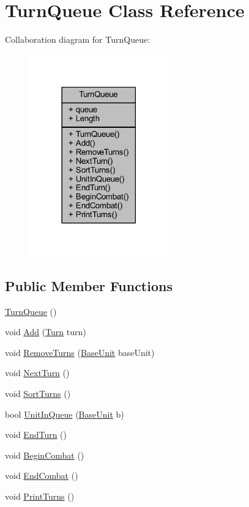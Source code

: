\hypertarget{class_turn_queue}{}\section{Turn\+Queue Class Reference}
\label{class_turn_queue}


Collaboration diagram for Turn\+Queue\+:
\nopagebreak
\begin{figure}[H]
\begin{center}
\leavevmode
\includegraphics[width=170pt]{class_turn_queue__coll__graph}
\end{center}
\end{figure}
\subsection*{Public Member Functions}
\begin{DoxyCompactItemize}
\item 
\mbox{\hyperlink{class_turn_queue_a15bbf8315c0dc5ad3d211872f3de296b}{Turn\+Queue}} ()
\item 
void \mbox{\hyperlink{class_turn_queue_aa677cc3ae9812e45a5b7e8932c199e27}{Add}} (\mbox{\hyperlink{class_turn}{Turn}} turn)
\item 
void \mbox{\hyperlink{class_turn_queue_af6ee9af337f42a417812f4bc96f8d600}{Remove\+Turns}} (\mbox{\hyperlink{class_base_unit}{Base\+Unit}} base\+Unit)
\item 
void \mbox{\hyperlink{class_turn_queue_acae6f91ff8006307a04d4ee9362c1b7e}{Next\+Turn}} ()
\item 
void \mbox{\hyperlink{class_turn_queue_afadc89a92617f7b2ee4e93025d2f2217}{Sort\+Turns}} ()
\item 
bool \mbox{\hyperlink{class_turn_queue_a7f1a7e7055e613cbd17f1d76d9bfd261}{Unit\+In\+Queue}} (\mbox{\hyperlink{class_base_unit}{Base\+Unit}} b)
\item 
void \mbox{\hyperlink{class_turn_queue_aadfdf0f72201cdc985ad2dbb9520eaee}{End\+Turn}} ()
\item 
void \mbox{\hyperlink{class_turn_queue_a7de50ac6b689f76c71d808962b6d1b86}{Begin\+Combat}} ()
\item 
void \mbox{\hyperlink{class_turn_queue_a9b3696b9a7672bbb8a79e3f0dc3ef393}{End\+Combat}} ()
\item 
void \mbox{\hyperlink{class_turn_queue_ae1c735b715ec963c76f0291cb9629338}{Print\+Turns}} ()
\end{DoxyCompactItemize}
